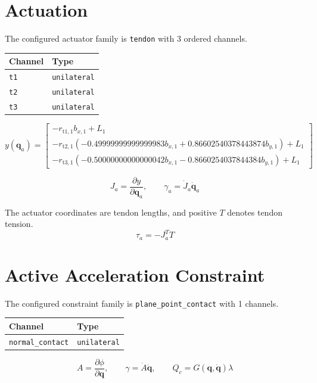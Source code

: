 \documentclass[11pt]{article}
\begin{document}
\section{Actuation}
The configured actuator family is \texttt{tendon} with 3 ordered channels.
\begin{center}
\begin{tabular}{ll}
\hline
Channel & Type \\
\hline
\texttt{t1} & \texttt{unilateral} \\
\texttt{t2} & \texttt{unilateral} \\
\texttt{t3} & \texttt{unilateral} \\
\hline
\end{tabular}
\end{center}
\begin{equation}
y(\boldsymbol q_a)=\begin{bmatrix}- r_{\mathrm{t1},1} b_{x,1} + L_{1}\\- r_{\mathrm{t2},1} \left(- 0.49999999999999983 b_{x,1} + 0.86602540378443874 b_{y,1}\right) + L_{1}\\- r_{\mathrm{t3},1} \left(- 0.50000000000000042 b_{x,1} - 0.8660254037844384 b_{y,1}\right) + L_{1}\end{bmatrix}
\end{equation}

\begin{equation}
J_a=\frac{\partial y}{\partial\boldsymbol q_a},\qquad \gamma_a=\dot J_a\dot{\boldsymbol q}_a
\end{equation}

The actuator coordinates are tendon lengths, and positive $T$ denotes tendon tension.
\begin{equation}
\tau_a=-J_a^TT
\end{equation}


\section{Active Acceleration Constraint}
The configured constraint family is \texttt{plane\_point\_contact} with 1 channels.
\begin{center}
\begin{tabular}{ll}
\hline
Channel & Type \\
\hline
\texttt{normal\_contact} & \texttt{unilateral} \\
\hline
\end{tabular}
\end{center}
\begin{equation}
A=\frac{\partial\phi}{\partial\boldsymbol q},\qquad \gamma=\dot A\dot{\boldsymbol q},\qquad Q_c=G(\boldsymbol q,\dot{\boldsymbol q})\lambda
\end{equation}
\end{document}
